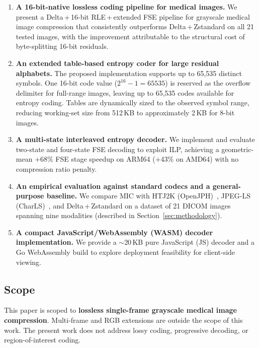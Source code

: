 \documentclass[journal]{IEEEtran}
\begin{document}
\begin{enumerate}
  \item \textbf{A 16-bit-native lossless coding pipeline for medical images.}
  We present a Delta\,+\,16-bit RLE\,+\,extended FSE pipeline for grayscale
  medical image compression that consistently outperforms Delta\,+\,Zstandard
  on all 21 tested images, with the improvement attributable to the structural
  cost of byte-splitting 16-bit residuals.

  \item \textbf{An extended table-based entropy coder for large residual
  alphabets.}
  The proposed implementation supports up to 65,535 distinct symbols.
  One 16-bit code value ($2^{16}-1 = 65535$) is reserved as the overflow
  delimiter for full-range images, leaving up to 65,535 codes available for
  entropy coding. Tables are dynamically sized to the observed symbol range,
  reducing working-set size from 512\,KB to approximately 2\,KB for 8-bit
  images.

  \item \textbf{A multi-state interleaved entropy decoder.}
  We implement and evaluate two-state and four-state FSE decoding to exploit
  ILP, achieving a geometric-mean $+$68\% FSE stage speedup on ARM64
  ($+$43\% on AMD64) with no compression ratio penalty.

  \item \textbf{An empirical evaluation against standard codecs and a
  general-purpose baseline.}
  We compare MIC with HTJ2K (OpenJPH)~\cite{openjph}, JPEG-LS
  (CharLS)~\cite{charls}, and Delta\,+\,Zstandard on a dataset of 21
  DICOM images spanning nine modalities (described in
  Section~\ref{sec:methodology}).

  \item \textbf{A compact JavaScript/WebAssembly (WASM) decoder implementation.}
  We provide a ${\sim}$20\,KB pure JavaScript (JS) decoder and a Go
  WebAssembly build to explore deployment feasibility for client-side viewing.
\end{enumerate}

\subsection{Scope}

This paper is scoped to \textbf{lossless single-frame grayscale medical image
compression}. Multi-frame and RGB extensions are outside the scope of this
work. The present work does not address lossy coding, progressive decoding, or
region-of-interest coding.
\end{document}
